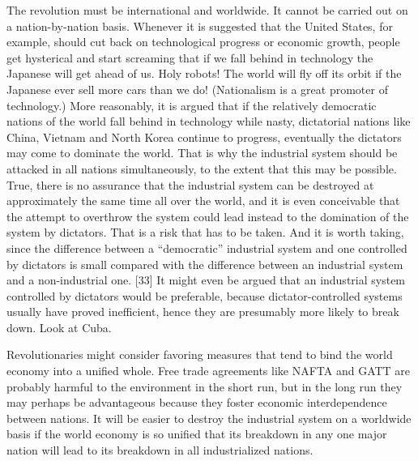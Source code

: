  The revolution must be international and worldwide. It cannot be carried out on a nation-by-nation basis. Whenever it is suggested that the United States, for example, should cut back on technological progress or economic growth, people get hysterical and start screaming that if we fall behind in technology the Japanese will get ahead of us. Holy robots! The world will fly off its orbit if the Japanese ever sell more cars than we do! (Nationalism is a great promoter of technology.) More reasonably, it is argued that if the relatively democratic nations of the world fall behind in technology while nasty, dictatorial nations like China, Vietnam and North Korea continue to progress, eventually the dictators may come to dominate the world. That is why the industrial system should be attacked in all nations simultaneously, to the extent that this may be possible. True, there is no assurance that the industrial system can be destroyed at approximately the same time all over the world, and it is even conceivable that the attempt to overthrow the system could lead instead to the domination of the system by dictators. That is a risk that has to be taken. And it is worth taking, since the difference between a “democratic” industrial system and one controlled by dictators is small compared with the difference between an industrial system and a non-industrial one. [33] It might even be argued that an industrial system controlled by dictators would be preferable, because dictator-controlled systems usually have proved inefficient, hence they are presumably more likely to break down. Look at Cuba.

 Revolutionaries might consider favoring measures that tend to bind the world economy into a unified whole. Free trade agreements like NAFTA and GATT are probably harmful to the environment in the short run, but in the long run they may perhaps be advantageous because they foster economic interdependence between nations. It will be easier to destroy the industrial system on a worldwide basis if the world economy is so unified that its breakdown in any one major nation will lead to its breakdown in all industrialized nations.

